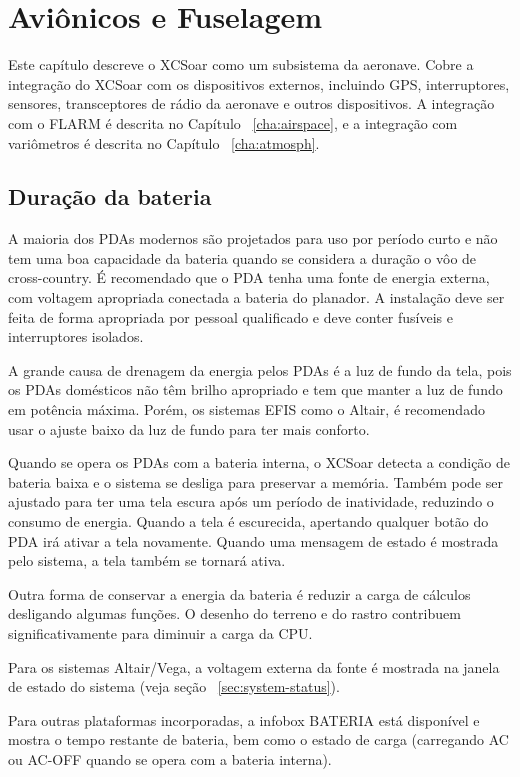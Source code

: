\chapter{Aviônicos e Fuselagem}\label{cha:avionics-airframe}

Este capítulo descreve o XCSoar como um subsistema da aeronave.  Cobre a integração do XCSoar com os dispositivos externos, incluindo GPS, interruptores, sensores, transceptores de rádio da aeronave e outros dispositivos.  A integração com o FLARM é descrita no Capítulo ~\ref{cha:airspace}, e a integração com variômetros é descrita no Capítulo ~\ref{cha:atmosph}.

\section{Duração da bateria}

A maioria dos PDAs modernos são projetados para uso por período curto e não tem uma boa capacidade da bateria quando se considera a duração o vôo de cross-country.  É recomendado que o PDA tenha uma fonte de energia externa, com voltagem apropriada conectada a bateria do planador.  A instalação deve ser feita de forma apropriada por pessoal qualificado e deve conter fusíveis e interruptores isolados.

A grande causa de drenagem da energia pelos PDAs é a luz de fundo da tela, pois os PDAs domésticos não têm brilho apropriado e tem que manter a luz de fundo em potência máxima.  Porém, os sistemas EFIS como o Altair, é recomendado usar o ajuste baixo da luz de fundo para ter mais conforto.

Quando se opera os PDAs com a bateria interna, o XCSoar detecta a condição de bateria baixa e o sistema se desliga para preservar a memória.  Também pode ser ajustado para ter uma tela escura após um período de inatividade, reduzindo o consumo de energia.  Quando a tela é escurecida, apertando qualquer botão do PDA irá ativar a tela novamente.  Quando uma mensagem de estado é mostrada pelo sistema, a tela também se tornará ativa.

Outra forma de conservar a energia da bateria é reduzir a carga de cálculos desligando algumas funções.  O desenho do terreno e do rastro contribuem significativamente para diminuir a carga da CPU.

Para os sistemas Altair/Vega, a voltagem externa da fonte é mostrada na janela de estado do sistema (veja seção 
~\ref{sec:system-status}).

Para outras plataformas incorporadas, a infobox BATERIA está disponível e mostra o tempo restante de bateria, bem como o estado de carga (carregando AC ou AC-OFF quando se opera com a bateria interna).  

